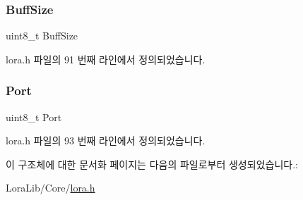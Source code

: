 \mbox{\label{structlora___app_data__t_a52d0e53a3b318f8c75791c051159efb0}} 
\subsubsection{\texorpdfstring{Buff\+Size}{BuffSize}}
{\footnotesize\ttfamily uint8\+\_\+t Buff\+Size}



lora.\+h 파일의 91 번째 라인에서 정의되었습니다.

\mbox{\label{structlora___app_data__t_a4b93121f04819fbab96346736fa720a9}} 
\subsubsection{\texorpdfstring{Port}{Port}}
{\footnotesize\ttfamily uint8\+\_\+t Port}



lora.\+h 파일의 93 번째 라인에서 정의되었습니다.



이 구조체에 대한 문서화 페이지는 다음의 파일로부터 생성되었습니다.\+:\begin{DoxyCompactItemize}
\item 
Lora\+Lib/\+Core/\mbox{\hyperlink{lora_8h}{lora.\+h}}\end{DoxyCompactItemize}
